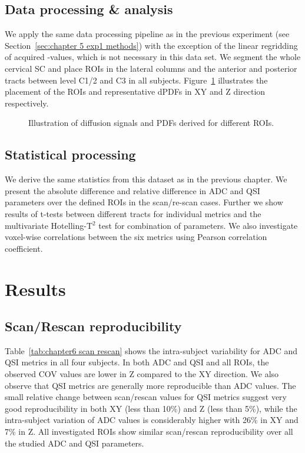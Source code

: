 \subsection{Data processing \& analysis}
We apply the same data processing pipeline as in the previous experiment (see Section~\ref{sec:chapter 5 exp1 methods}) with the exception of the linear regridding of acquired \q-values, which is not necessary in this data set. We segment the whole cervical {\gls{SC}} and place \glspl{ROI} in the lateral columns and the anterior and posterior tracts between level C1/2 and C3 in all subjects. Figure~\ref{fig:chapter6 exp2 ROI and PDFs} illustrates the placement of the \glspl{ROI} and representative dPDFs in XY and Z direction respectively.

\begin{figure}[tbh]
      \centering
      \caption{Illustration of diffusion signals and PDFs derived for different ROIs.}
      \label{fig:chapter6 exp2 ROI and PDFs}
  \end{figure}

\subsection{Statistical processing} We derive the same statistics from this dataset as in the previous chapter. We present the absolute difference and relative difference in ADC and \gls{QSI} parameters over the defined \glspl{ROI} in the scan/re-scan cases. Further we show results of t-tests between different tracts for individual metrics and the multivariate Hotelling-T$^2$ test for combination of parameters. We also investigate voxel-wise correlations between the six metrics using Pearson correlation coefficient.


\section{Results}
\subsection{Scan/Rescan reproducibility}
\label{par:chapter6 reproducibility}
Table~\ref{tab:chapter6 scan rescan} shows the intra-subject variability for ADC and QSI metrics in all four subjects. In both ADC and QSI and all \glspl{ROI}, the observed COV values are lower in Z compared to the XY direction. We also observe that QSI metrics are generally more reproducible than ADC values. The small relative change between scan/rescan values for QSI metrics suggest very good reproducibility in both XY (less than 10\%) and Z (less than 5\%), while the intra-subject variation of ADC values is considerably higher with 26\% in XY and 7\% in Z. All investigated \glspl{ROI} show similar scan/rescan reproducibility over all the studied ADC and QSI parameters.

